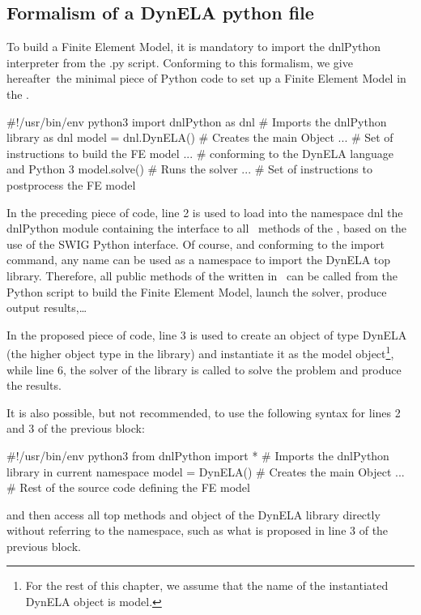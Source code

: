 \subsection{Formalism of a DynELA python file}

To build a Finite Element Model, it is mandatory to import the \textsf{dnlPython} interpreter from the \textsf{.py} script. Conforming to this formalism, we give hereafter the minimal piece of Python code to set up a Finite Element Model in the \DynELA.

\begin{PythonListing}
#!/usr/bin/env python3
import dnlPython as dnl # Imports the dnlPython library as dnl
model = dnl.DynELA()    # Creates the main Object
...                     # Set of instructions to build the FE model
...                     # conforming to the DynELA language and Python 3
model.solve()           # Runs the solver
...                     # Set of instructions to postprocess the FE model
\end{PythonListing}

In the preceding piece of code, line 2 is used to load into the namespace \textsf{dnl} the \textsf{dnlPython} module containing the interface to all \Cpp~methods of the \DynELA, based on the use of the SWIG Python interface. Of course, and conforming to the \textsf{import} command, any name can be used as a namespace to import the DynELA top library. Therefore, all public methods of the \DynELA written in \Cpp~can be called from the Python script to build the Finite Element Model, launch the solver, produce output results,\ldots

In the proposed piece of code, line 3 is used to create an object of type \textsf{DynELA} (the higher object type in the \DynELA library) and instantiate it as the \textsf{model} object\footnote{For the rest of this chapter, we assume that the name of the instantiated \textsf{DynELA} object is \textsf{model}.}, while line 6, the solver of the \DynELA library is called to solve the problem and produce the results.

It is also possible, but not recommended, to use the following syntax for lines 2 and 3 of the previous block:
\begin{PythonListing}
#!/usr/bin/env python3
from dnlPython import * # Imports the dnlPython library in current namespace
model = DynELA()        # Creates the main Object
...                     # Rest of the source code defining the FE model
\end{PythonListing}
and then access all top methods and object of the DynELA library directly without referring to the namespace, such as what is proposed in line 3 of the previous block.

